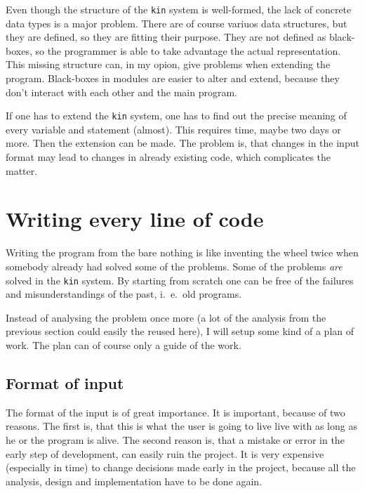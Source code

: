 Even though the structure of the {\tt kin} system is well-formed, the 
lack of concrete data types is a major problem. There are of course 
variuos data structures, but they are defined, so they are fitting their
purpose. They are not defined as black-boxes, so the programmer is 
able to take advantage the actual representation. This missing structure
can, in my opion, give problems when extending the program. Black-boxes in
modules are easier to alter and extend, because they don't interact with
each other and the main program. 

If one has to extend the {\tt kin} system, one has to find out the precise
meaning of every variable and statement (almost). This requires time, 
maybe two days or more. Then the extension can be made. The problem is, that
changes in the input format may lead to changes in already existing code,  
which complicates the matter.

\section{Writing every line of code}
Writing the program from the bare nothing is like inventing the wheel twice
when somebody already had solved some of the problems. Some of the problems
{\em are} solved in the {\tt kin} system. By starting from scratch one
can be free of the failures and misunderstandings
of the past, i.\ e.\ old programs. 

Instead of analysing the problem once more (a lot of the analysis from
the previous section could easily the reused here), I will setup some
kind of a plan of work. The plan can of course only a guide of the
work.

\subsection{Format of input}
The format of the input is of great importance. It is important, because
of two reasons. The first is, that this is what the user is going to live 
live with as long as he or the program is alive. The second reason is, that
a mistake or error in the early step of development, can easily ruin the
project. It is very expensive (especially in time) to change decisions
made early in the project, because all the analysis, design and implementation
have to be done again.

